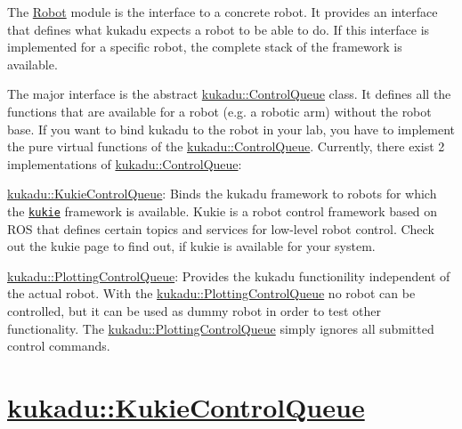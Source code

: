 The \hyperlink{group__Robot}{Robot} module is the interface to a concrete robot. It provides an interface that defines what kukadu expects a robot to be able to do. If this interface is implemented for a specific robot, the complete stack of the framework is available.

The major interface is the abstract \hyperlink{classkukadu_1_1ControlQueue}{kukadu\-::\-Control\-Queue} class. It defines all the functions that are available for a robot (e.\-g. a robotic arm) without the robot base. If you want to bind kukadu to the robot in your lab, you have to implement the pure virtual functions of the \hyperlink{classkukadu_1_1ControlQueue}{kukadu\-::\-Control\-Queue}. Currently, there exist 2 implementations of \hyperlink{classkukadu_1_1ControlQueue}{kukadu\-::\-Control\-Queue}\-:
\begin{DoxyItemize}
\item \hyperlink{classkukadu_1_1KukieControlQueue}{kukadu\-::\-Kukie\-Control\-Queue}\-: Binds the kukadu framework to robots for which the \href{https://iis.uibk.ac.at/intranet/projects/robot/armtopics}{\tt kukie} framework is available. Kukie is a robot control framework based on R\-O\-S that defines certain topics and services for low-\/level robot control. Check out the kukie page to find out, if kukie is available for your system.
\item \hyperlink{classkukadu_1_1PlottingControlQueue}{kukadu\-::\-Plotting\-Control\-Queue}\-: Provides the kukadu functionility independent of the actual robot. With the \hyperlink{classkukadu_1_1PlottingControlQueue}{kukadu\-::\-Plotting\-Control\-Queue} no robot can be controlled, but it can be used as dummy robot in order to test other functionality. The \hyperlink{classkukadu_1_1PlottingControlQueue}{kukadu\-::\-Plotting\-Control\-Queue} simply ignores all submitted control commands.
\end{DoxyItemize}

\section*{\hyperlink{classkukadu_1_1KukieControlQueue}{kukadu\-::\-Kukie\-Control\-Queue}}

